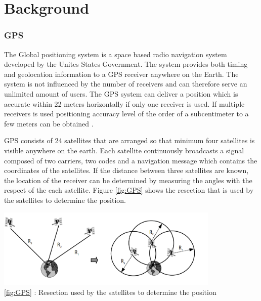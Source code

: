 

\chapter{Background}



\subsection{GPS}
The Global positioning system is a space based radio navigation system developed by the Unites States Government.  The system provides both timing and geolocation information to a GPS receiver anywhere on the Earth.  The system is not influenced by the number of receivers and can therefore serve an unlimited amount of users. The GPS system can deliver a position which is accurate within 22 meters horizontally if only one receiver is used. If multiple receivers is used positioning accuracy level of the order of a subcentimeter to a few meters can be obtained \cite{GPS}.

GPS consists of 24 satellites that are arranged so that minimum four satellites is visible anywhere on the earth. Each satellite continuously broadcasts a signal composed of two carriers, two codes and a navigation message which contains the coordinates of the satellites.  If the distance between three satellites are known, the location of the receiver can be determined by measuring the angles with the respect of the each satellite.  Figure \ref{fig:GPS} shows the resection that is used by the satellites to determine the position.\\

\begin{minipage}[t]{0.8\textwidth}
    \centering
    \includegraphics[width=0.8\textwidth]{Images/gps.PNG}\\
    \caption{\ref{fig:GPS} : Resection used by the satellites to determine the position}
    \label{fig:GPS}
\end{minipage}
\\


